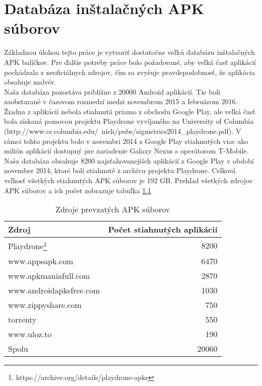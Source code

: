 \chapter{Databáza inštalačných APK súborov}
Základnou úlohou tejto práce je vytvoriť dostatočne veľkú databázu inštalačných APK balíčkov. Pre ďalšie potreby práce bolo požadované, aby veľká časť aplikácií pochádzala z neoficiálnych zdrojov, čím sa zvyšuje pravdepodobnosť, že aplikácia obsahuje malvér.\\
Naša databáza pozostáva približne z 20000 Android aplikácií. Tie boli zaobstarané v časovom rozmedzí medzi novembrom 2015 a februárom 2016. Žiadna z aplikácií nebola stiahnutá priamo z obchodu Google Play, ale veľká časť bola získaná pomocou projektu Playdrone vyvíjaného na University of Columbia (http://www.cs.columbia.edu/~nieh/pubs/sigmetrics2014\_playdrone.pdf). V rámci tohto projektu bolo v novembri 2014 z Google Play stiahnutých viac ako milión aplikácií dostupný pre zariadenie Galaxy Nexus s operátorom T-Mobile. Naša databáza obsahuje 8200 najsťahovanejších aplikácií z Google Play v období november 2014, ktoré boli stiahnuté z archívu projektu Playdrone. 
Celková veľkosť všetkých stiahnutých APK súborov je 192 GB. Prehľad všetkých zdrojov APK súborov a ich počet zobrazuje tabuľka \ref{tab:stahovanie} 

\begin{table}[htb]
\centering
  \begin{tabular}{|l r|}
    \hline
    Zdroj & Počet stiahnutých aplikácií \\\hline\hline
    Playdrone\footnote{https://archive.org/details/playdrone-apks} & 8200 \\
    www.appsapk.com & 6470 \\
    www.apkmaniafull.com & 2870 \\
    www.androidapksfree.com & 1030 \\
    www.zippyshare.com & 750 \\
    torrenty & 550 \\
    www.uloz.to & 190 \\
    \midrule\hline
    Spolu & 20060 \\
    \hline
  \end{tabular}
  \caption{Zdroje prevzatých APK súborov}
  \label{tab:stahovanie}
\end{table}


